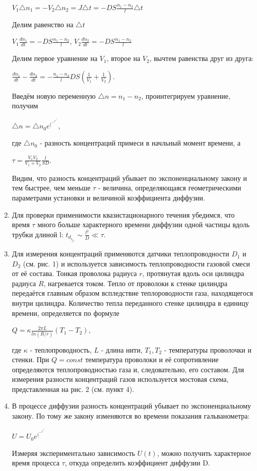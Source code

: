 \documentclass{article}
\begin{document}
\begin{enumerate}
\begin{center}
$V_1 \triangle n_1 = - V_2 \triangle n_2 = J \triangle t = -DS \frac{n_1-n_2}{l} \triangle t$
\end{center}
Делим равенство на $\triangle t$
\begin{center}
$V_1 \frac{dn_1}{dt} = -DS\frac{n_1-n_2}{l}$, $V_2 \frac{dn_2}{dt} = -DS\frac{n_1-n_2}{l}$
\end{center}
Делим первое уравнение на $V_1$, второе на $V_2$, вычтем равенства друг из друга:
\begin{center}
$\frac{dn_1}{dt}- \frac{dn_2}{dt} = - \frac{n_1-n_2}{l}DS(\frac{1}{V_1} +\frac{1}{V_2} )$.
\end{center}
Введём новую переменную $\triangle n = n_1-n_2$, проинтегрируем уравнение, получим
\begin{center}
$\triangle n = \triangle n_0 e^(^-^t^/^\tau^)$,
\end{center}
где $\triangle n_0$ - разность концентраций примеси в начльный момент времени, а
\begin{center}
$\tau = \frac{V_1 V_2}{V_1 + V_2} \frac {l}{SD}$.
\end{center}
Видим, что разность концентраций убывает по экспоненциальному закону и тем быстрее, чем меньше $\tau$ - величина, определяющаяся геометрическими параметрами установки и величиной коэффициента диффузии.
\item Для проверки применимости квазистационарного течения убедимся, что время $\tau$ много больше характерного времени диффузии одной частицы вдоль трубки длиной l: $t_d_i_f_f \sim \frac{l^2}{D} \ll \tau$.

\item Для измерения концентраций применяются датчики теплопроводности $D_1$ и $D_2$ (см. рис. 1) и используется зависимость теплопроводности газовой смеси от её состава. Тонкая проволока радиуса $r$, протянутая вдоль оси цилиндра радиуса $R$, нагревается током. Тепло от проволоки к стенке цилиндра передаётся главным образом вспледствие теплороводности газа, находящегося внутри цилиндра. Количество тепла переданного стенке цилиндра в единицу времени, определяется по формуле 
\begin{center}
$Q = \kappa \frac{2\pi L}{ln (R/r)}(T_1-T_2)$,
\end{center}
где $\kappa$ - теплопроводность, $L$ - длина нити, $T_1, T_2$ - температуры проволочки и стенки. При $Q = const$ температура проволоки и её сопротивление определяются теплопроводностью газа и, следовательно, его составом. Для измерения разности концентраций газов используется  
мостовая схема, представленная на рис. 2 (см. пункт 4).

\item В процессе диффузии разность концентраций убывает по экспоненциальному закону. По тому же закону изменяются во времени показания гальванометра:
\begin{center}
$U = U_0 e^(^-^t^/^\tau^)$
\end{center}
Измеряя экспериментально зависимость $U(t)$, можно получить характерное время процесса $\tau$, откуда определить коэффициент диффузии D.
\end{enumerate}
\end{document}
